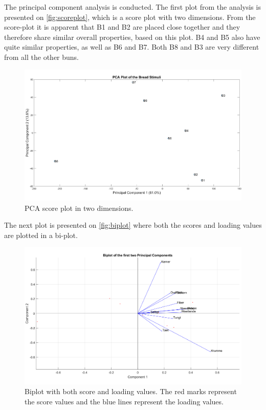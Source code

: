 \noindent
%
%
The principal component analysis is conducted. The first plot from the analysis is presented on \autoref{fig:scoreplot}, which is a score plot with two dimensions. \blankline
%
From the score-plot it is apparent that B1 and B2 are placed close together and they therefore share similar overall properties, based on this plot. B4 and B5 also have quite similar properties, as well as B6 and B7. Both B8 and B3 are very different from all the other buns.
\newpage
%
\begin{figure}[H]
\centering
\includegraphics[width =\textwidth]{Figure/PCA_plot}
\caption{PCA score plot in two dimensions.}
\label{fig:scoreplot}
\end{figure}
\noindent 
%
The next plot is presented on \autoref{fig:biplot} where both the scores and loading values are plotted in a bi-plot. 
%
\begin{figure}[H]
\centering
\includegraphics[width =\textwidth]{Figure/biplot}
\caption{Biplot with both score and loading values. The red marks represent the score values and the blue lines represent the loading values.}
\label{fig:biplot}
\end{figure}
